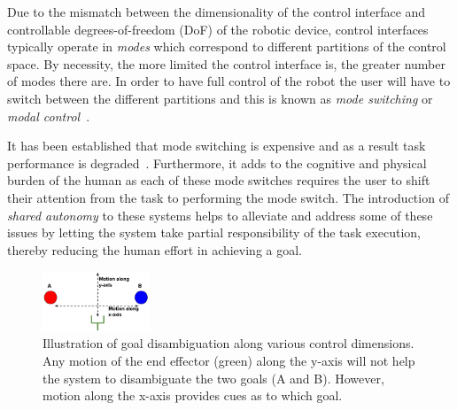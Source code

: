 \documentclass[conference]{IEEEtran}
\begin{document}
Due to the mismatch between the dimensionality of the control interface and controllable degrees-of-freedom (DoF) of the robotic device, control interfaces typically operate in \textit{modes} which correspond to different partitions of the control space. By necessity, the more limited the control interface is, the greater number of modes there are. In order to have full control of the robot the user will have to switch between the different partitions and this is known as \textit{mode switching} or \textit{modal control}~\cite{nuttin2002selection,tsui2008development}. 

It has been established that mode switching is expensive and as a result task performance is degraded~\cite{herlant2016assistive}. Furthermore, it adds to the cognitive and physical burden of the human as each of these mode switches requires the user to shift their attention from the task to performing the mode switch. The introduction of \textit{shared autonomy} to these systems helps to alleviate and address some of these issues by letting the system take partial responsibility of the task execution, thereby reducing the human effort in achieving a goal. 
\begin{figure}[b]
	\begin{center}
		\includegraphics[width=0.285\textwidth]{./figures/DE_PDF.pdf}
	\end{center}
	\caption{Illustration of goal disambiguation along various control dimensions. Any motion of the end effector (green) along the y-axis will not help the system to disambiguate the two goals (A and B). However, motion along the x-axis provides cues as to which goal.}
	\label{DE}
\end{figure}
\end{document}
